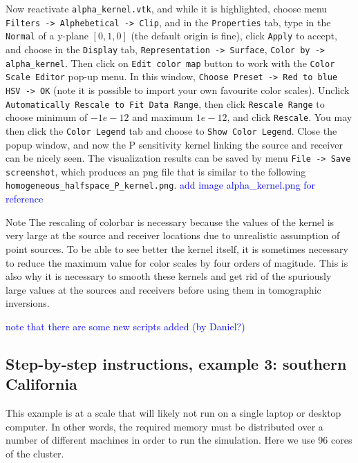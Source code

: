 \documentclass[10pt,fleqn,letterpaper]{article}
\newcommand{\blue}[1]{\textcolor{blue}{#1}}
\begin{document}
\begin{enumerate}
  Now reactivate \verb+alpha_kernel.vtk+, and while it is highlighted, choose menu \verb+Filters -> Alphebetical -> Clip+, and in the \verb+Properties+ tab, type in the \verb+Normal+ of a y-plane $[0,1,0]$ (the default origin is fine), click \verb+Apply+ to accept, and choose in the \verb+Display+ tab, \verb+Representation -> Surface+, \verb+Color by -> alpha_kernel+. Then click on \verb+Edit color map+ button to work with the \verb+Color Scale Editor+ pop-up menu. In this window, \verb+Choose Preset -> Red to blue HSV -> OK+ (note it is possible to import your own favourite color scales). Unclick \verb+Automatically Rescale to Fit Data Range+, then click \verb+Rescale Range+ to choose minimum of $-1e-12$ and maximum $1e-12$, and click \verb+Rescale+. You may then click the \verb+Color Legend+ tab and choose to \verb+Show Color Legend+. Close the popup window, and now the P sensitivity kernel linking the source and receiver can be nicely seen. The visualization results can be saved by menu \verb+File -> Save screenshot+, which produces an png file that is similar to the following \verb+homogeneous_halfspace_P_kernel.png+.
\blue{add image alpha\_kernel.png for reference}
 
  Note The rescaling of colorbar is necessary because the values of the kernel is very large at the source and receiver locations due to unrealistic assumption of point sources. To be able to see better the kernel itself, it is sometimes necessary to reduce the maximum value for color scales by four orders of magitude. This is also why it is necessary to smooth these kernels and get rid of the spuriously large values at the sources and receivers before using them in tomographic inversions.
   

\end{enumerate}

\blue{note that there are some new scripts added (by Daniel?)}



\subsection*{Step-by-step instructions, example 3: southern California}

This example is at a scale that will likely not run on a single laptop or desktop computer. In other words, the required memory must be distributed over a number of different machines in order to run the simulation. Here we use 96 cores of the cluster.
\end{document}
